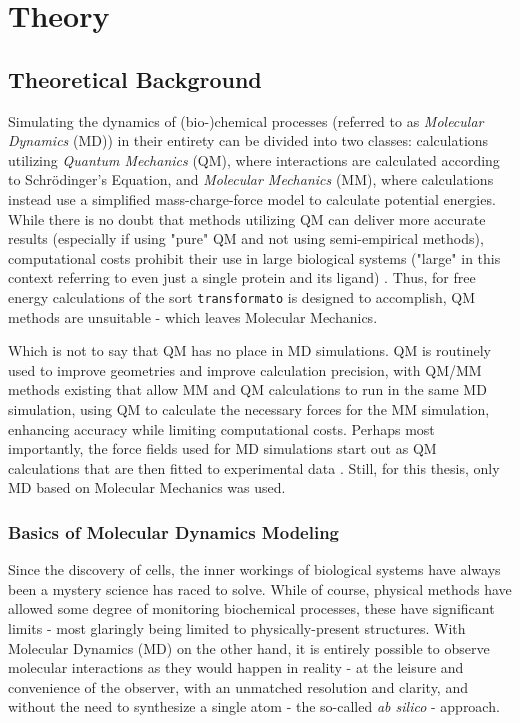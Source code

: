 \documentclass[oneside]{scrreprt}
\begin{document}
\chapter{Theory}

\section{Theoretical Background}
Simulating the dynamics of (bio-)chemical processes (referred to as \emph{Molecular Dynamics} (MD)) in their entirety can be divided into two classes: calculations utilizing \emph{Quantum Mechanics} (QM), where interactions are calculated according to Schrödinger's Equation, and \emph{Molecular Mechanics} (MM), where calculations instead use a simplified mass-charge-force model to calculate potential energies. While there is no doubt that methods utilizing QM can deliver more accurate results (especially if using "pure" QM and not using semi-empirical methods), computational costs prohibit their use in large biological systems ("large" in this context referring to even just a single protein and its ligand) \cite{cournia_relative_2017}. Thus, for free energy calculations of the sort \texttt{transformato} is designed to accomplish, QM methods are unsuitable - which leaves Molecular Mechanics.

Which is not to say that QM has no place in MD simulations. QM is routinely used to improve geometries and improve calculation precision, with QM/MM methods existing that allow MM and QM calculations to run in the same MD simulation, using QM to calculate the necessary forces for the MM simulation, enhancing accuracy while limiting computational costs. Perhaps most importantly, the force fields used for MD simulations start out as QM calculations that are then fitted to experimental data \cite{vanommeslaeghe_charmm_2010}. Still, for this thesis, only MD based on Molecular Mechanics was used.



\subsection{Basics of Molecular Dynamics Modeling}

Since the discovery of cells, the inner workings of biological systems have always been a mystery science has raced to solve. While of course, physical methods have allowed some degree of monitoring biochemical processes, these have significant limits - most glaringly being limited to physically-present structures. With Molecular Dynamics (MD) on the other hand, it is entirely possible to observe molecular interactions as they would happen in reality - at the leisure and convenience of the observer, with an unmatched resolution and clarity, and without the need to synthesize a single atom - the so-called \emph{ab silico} - approach.
\end{document}

